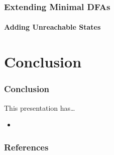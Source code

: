 \documentclass[handout,10pt]{beamer}%
\begin{document}
	\begin{frame}
		\frametitle{Extending Minimal DFAs}
		\framesubtitle{Adding Unreachable States}
	
	\end{frame}
	
	\section{Conclusion}

	\begin{frame}
		\frametitle{Conclusion}
		
		This presentation has\ldots
		\begin{itemize}
			\item 
		\end{itemize}
	
	\end{frame}

	\begin{frame}
		\frametitle{References}
		
		\tiny
		
		
	\end{frame}
\end{document}
